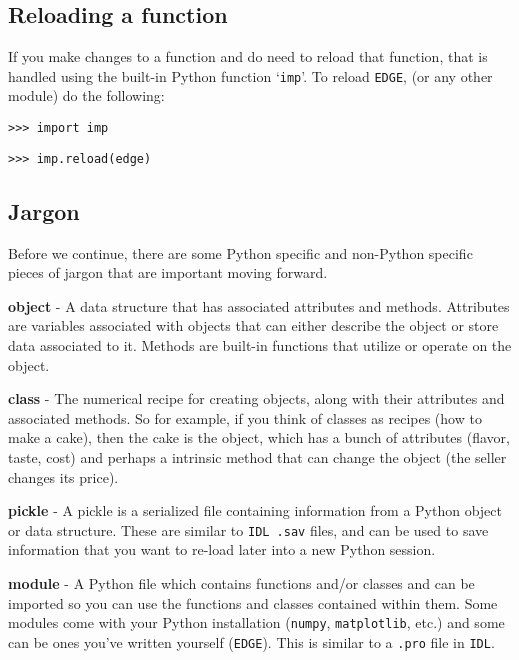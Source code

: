 \documentclass{article}
\begin{document}
\subsection{Reloading a function}

If you make changes to a function and do need to reload that function, that is handled using the built-in Python function `\texttt{imp}'. To reload \texttt{EDGE}, (or any other module) do the following:

\vspace{2mm}
\texttt{>>> import imp}

\texttt{>>> imp.reload(edge)}
\vspace{2mm}

\subsection{Jargon}  
 
Before we continue, there are some Python specific and non-Python specific pieces of jargon that are important moving forward.
 
\vspace{2mm}

\noindent \textbf{object} - A data structure that has associated attributes and methods. Attributes are variables associated with objects that can either describe the object or store data associated to it. Methods are built-in functions that utilize or operate on the object.

\noindent \textbf{class} - The numerical recipe for creating objects, along with their attributes and associated methods. So for example, if you think of classes as recipes (how to make a cake), then the cake is the object, which has a bunch of attributes (flavor, taste, cost) and perhaps a intrinsic method that can change the object (the seller changes its price).

\noindent \textbf{pickle} - A pickle is a serialized file containing information from a Python object or data structure. These are similar to \texttt{IDL .sav} files, and can be used to save information that you want to re-load later into a new Python session. 
 
\noindent \textbf{module} - A Python file which contains functions and/or classes and can be imported so you can use the functions and classes contained within them. Some modules come with your Python installation (\texttt{numpy}, \texttt{matplotlib}, etc.) and some can be ones you’ve written yourself (\texttt{EDGE}). This is similar to a \texttt{.pro} file in \texttt{IDL}. 
 
\end{document}
